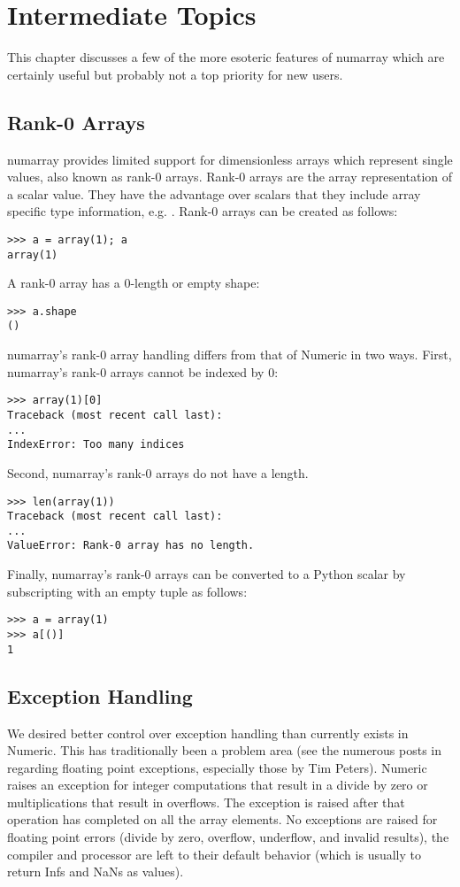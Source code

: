 \chapter{Intermediate Topics}
\label{cha:intermediate-topics}

This chapter discusses a few of the more esoteric features of numarray which
are certainly useful but probably not a top priority for new users.

\section{Rank-0 Arrays}
\label{sec:rank-0-arrays}
numarray provides limited support for dimensionless arrays which represent
single values, also known as rank-0 arrays.  Rank-0 arrays are the array
representation of a scalar value.  They have the advantage over scalars that
they include array specific type information, e.g. .  Rank-0 arrays
can be created as follows:
\begin{verbatim}
>>> a = array(1); a
array(1)
\end{verbatim}
A rank-0 array has a 0-length or empty shape:
\begin{verbatim}
>>> a.shape
()
\end{verbatim}
numarray's rank-0 array handling differs from that of Numeric in two ways.
First, numarray's rank-0 arrays cannot be indexed by 0:
\begin{verbatim}
>>> array(1)[0]
Traceback (most recent call last):
...
IndexError: Too many indices
\end{verbatim}
Second, numarray's rank-0 arrays do not have a length.
\begin{verbatim}
>>> len(array(1))
Traceback (most recent call last):
...
ValueError: Rank-0 array has no length.
\end{verbatim}
Finally, numarray's rank-0 arrays can be converted to a Python scalar by
subscripting with an empty tuple as follows:
\begin{verbatim}
>>> a = array(1)
>>> a[()]
1
\end{verbatim}

\newpage
\section{Exception Handling}
\label{sec:exception-handling}

We desired better control over exception handling than currently exists in
Numeric. This has traditionally been a problem area (see the numerous posts in
 regarding floating point
exceptions, especially those by Tim Peters). Numeric raises an exception for
integer computations that result in a divide by zero or multiplications that
result in overflows. The exception is raised after that operation has completed
on all the array elements. No exceptions are raised for floating point errors
(divide by zero, overflow, underflow, and invalid results), the compiler and
processor are left to their default behavior (which is usually to return Infs
and NaNs as values).

